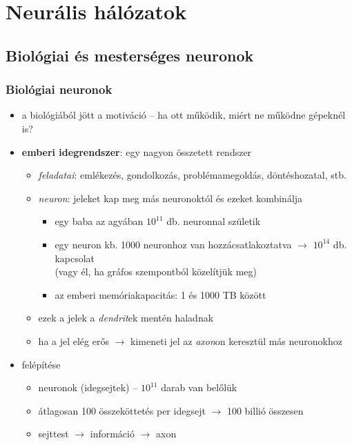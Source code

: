 \documentclass[a4paper, 11pt]{article}
\begin{document}
\newpage

\section{Neurális hálózatok}

\subsection{Biológiai és mesterséges neuronok}

\subsubsection{Biológiai neuronok}

\begin{itemize}
	\item a biológiából jött a motiváció -- ha ott működik, miért ne működne gépeknél is?
	\item \textbf{emberi idegrendszer}: egy nagyon összetett rendszer
	\begin{itemize}
		\item \textit{feladatai}: emlékezés, gondolkozás, problémamegoldás, döntéshozatal, stb.
		\item \textit{neuron}: jeleket kap meg más neuronoktól és ezeket kombinálja
		\begin{itemize}
			\item egy baba az agyában $10^{11}$ db. neuronnal születik
			\item egy neuron kb. 1000 neuronhoz van hozzácsatlakoztatva $\to$ $10^{14}$ db. kapcsolat \\ (vagy él, ha gráfos szempontból közelítjük meg)
			\item az emberi memóriakapacitás: 1 és 1000 TB között
		\end{itemize}
		\item ezek a jelek a \textit{dendrit}ek mentén haladnak
		\item ha a jel elég erős $\to$ kimeneti jel az \textit{axon}on keresztül más neuronokhoz
	\end{itemize}
	\item felépítése
	\begin{itemize}
		\item neuronok (idegsejtek) -- $10^{11}$ darab van belőlük
		\item átlagosan 100 összeköttetés per idegsejt $\to$ 100 billió összesen
		\item sejttest $\to$ információ $\to$ axon
	\end{itemize}
\end{itemize}
\end{document}
